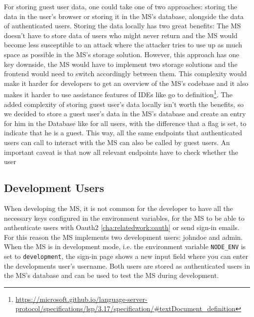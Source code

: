 For storing guest user data, one could take one of two approaches:
storing the data in the user's browser or storing it in the MS's database, alongside the
data of authenticated users.
Storing the data locally has two great benefits: 
The MS doesn't have to store data of users who might never return and
the MS would become less susceptible to an attack where the attacker tries to use up as
much space as possible in the MS's storage solution.
However, this approach has one key downside, the MS would have to implement two storage
solutions and the frontend would need to switch accordingly between them.
This complexity would make it harder for developers to get an overview of the MS's
codebase and it also makes it harder to use assistance features of IDEs like go to
definition\footnote{\url{https://microsoft.github.io/language-server-protocol/specifications/lsp/3.17/specification/#textDocument_definition}}.
The added complexity of storing guest user's data locally isn't worth the benefits, so we
decided to store a guest user's data in the MS's database and create an entry for him in
the Database like for all users, with the difference that a flag is set, to indicate that
he is a guest.
This way, all the same endpoints that authenticated users can call to interact with the MS
can also be called by guest users.
An important caveat is that now all relevant endpoints have to check whether the user 

\subsection{Development Users}

When developing the MS, it is not common for the developer to have all the necessary keys
configured in the environment variables, for the MS to be able to authenticate users with
Oauth2 \ref{cha:relatedwork:oauth} or send sign-in emails.
For this reason the MS implements two development users: johndoe and admin.
When the MS is in development mode, i.e. the environment variable \lstinline{NODE_ENV} is
set to \lstinline{development},
the sign-in page shows a new input field where you can enter the developments user's username.
Both users are stored as authenticated users in the MS's database and can be used to test
the MS during development.



%

